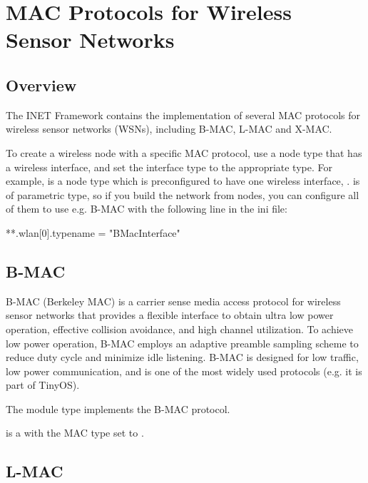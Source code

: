 \chapter{MAC Protocols for Wireless Sensor Networks}
\label{cha:sensor-macs}

\section{Overview}
\label{sec:sensor-macs:overview}

The INET Framework contains the implementation of several MAC protocols
for wireless sensor networks (WSNs), including B-MAC, L-MAC and X-MAC.

To create a wireless node with a specific MAC protocol, use a node type
that has a wireless interface, and set the interface type to the
appropriate type. For example,  is a node type
which is preconfigured to have one wireless interface, .
 is of parametric type, so if you build the network from
 nodes, you can configure all of them to use
e.g. B-MAC with the following line in the ini file:

\begin{inifile}
**.wlan[0].typename = "BMacInterface"
\end{inifile}


\section{B-MAC}
\label{sec:sensor-macs:b-mac}

B-MAC (Berkeley MAC) is a carrier sense media access protocol for
wireless sensor networks that provides a flexible interface to obtain
ultra low power operation, effective collision avoidance, and
high channel utilization. To achieve low power operation,
B-MAC employs an adaptive preamble sampling scheme to reduce duty cycle
and minimize idle listening. B-MAC is designed for low traffic,
low power communication, and is one of the most widely used
protocols (e.g. it is part of TinyOS).

The  module type implements the B-MAC protocol.

 is a  with the MAC type
set to .


\section{L-MAC}
\label{sec:sensor-macs:l-mac}

